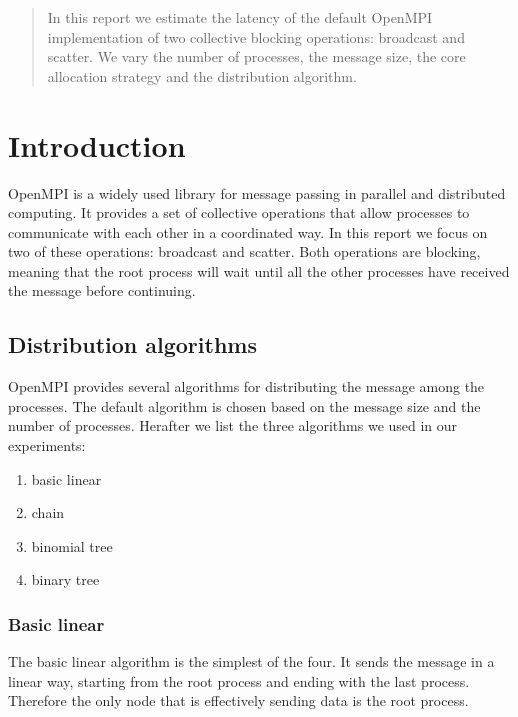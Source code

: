 %
%
\begin{abstract}
    In this report we estimate the latency of the default OpenMPI
    implementation of two collective blocking operations: broadcast
    and scatter. We vary the number of processes, the message size,    
    the core allocation strategy and the distribution algorithm.
\end{abstract}

\maketitle

\section{Introduction}
    OpenMPI is a widely used library for message passing in parallel
    and distributed computing. It provides a set of collective operations
    that allow processes to communicate with each other in a coordinated
    way. In this report we focus on two of these operations: broadcast
    and scatter. Both operations are blocking, meaning that the root
    process will wait until all the other processes have received the
    message before continuing.


\subsection{Distribution algorithms}
    OpenMPI provides several algorithms for distributing the message
    among the processes. The default algorithm is chosen based on the
    message size and the number of processes. Herafter we list the three
    algorithms we used in our experiments:
    \begin{enumerate}
        \item basic linear
        \item chain
        \item binomial tree
        \item binary tree
    \end{enumerate}
\subsubsection{Basic linear}
    The basic linear algorithm is the simplest of the four. It sends
    the message in a linear way, starting from the root process
    and ending with the last process. Therefore the only node that
    is effectively sending data is the root process.
